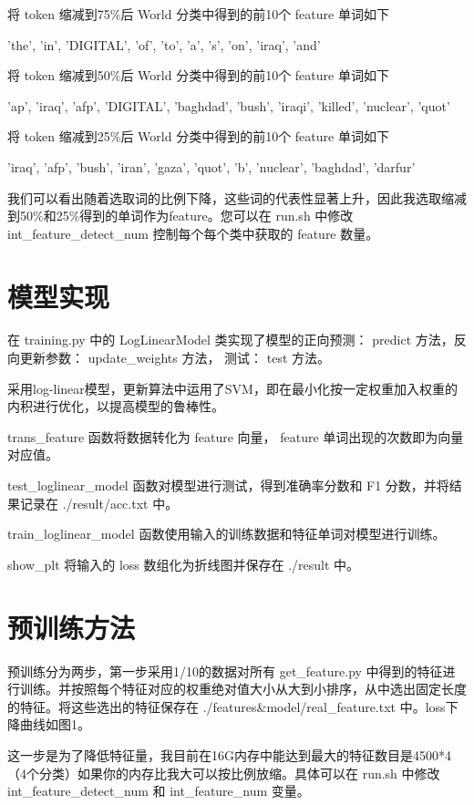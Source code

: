 \documentclass[12pt,letterpaper]{article}
\begin{document}
将 token 缩减到75\%后 World 分类中得到的前10个 feature 单词如下

'the', 'in', 'DIGITAL', 'of', 'to', 'a', 's', 'on', 'iraq', 'and'

将 token 缩减到50\%后 World 分类中得到的前10个 feature 单词如下

'ap', 'iraq', 'afp', 'DIGITAL', 'baghdad', 'bush', 'iraqi', 'killed', 'nuclear', 'quot'

将 token 缩减到25\%后 World 分类中得到的前10个 feature 单词如下

'iraq', 'afp', 'bush', 'iran', 'gaza', 'quot', 'b', 'nuclear', 'baghdad', 'darfur'

我们可以看出随着选取词的比例下降，这些词的代表性显著上升，因此我选取缩减到50\%和25\%得到的单词作为feature。您可以在 run.sh 中修改 int\_feature\_detect\_num 控制每个每个类中获取的 feature 数量。

\section{模型实现}

在 training.py 中的 LogLinearModel 类实现了模型的正向预测： predict 方法，反向更新参数： update\_weights 方法， 测试： test 方法。

采用log-linear模型，更新算法中运用了SVM，即在最小化按一定权重加入权重的内积进行优化，以提高模型的鲁棒性。

trans\_feature 函数将数据转化为 feature 向量， feature 单词出现的次数即为向量对应值。

test\_loglinear\_model 函数对模型进行测试，得到准确率分数和 F1 分数，并将结果记录在 ./result/acc.txt 中。

train\_loglinear\_model 函数使用输入的训练数据和特征单词对模型进行训练。

show\_plt 将输入的 loss 数组化为折线图并保存在 ./result 中。

\section{预训练方法}

预训练分为两步，第一步采用1/10的数据对所有 get\_feature.py 中得到的特征进行训练。并按照每个特征对应的权重绝对值大小从大到小排序，从中选出固定长度的特征。将这些选出的特征保存在 ./features\&model/real\_feature.txt 中。loss下降曲线如图1。

这一步是为了降低特征量，我目前在16G内存中能达到最大的特征数目是4500*4（4个分类）如果你的内存比我大可以按比例放缩。具体可以在 run.sh 中修改 int\_feature\_detect\_num 和 int\_feature\_num 变量。
\end{document}

